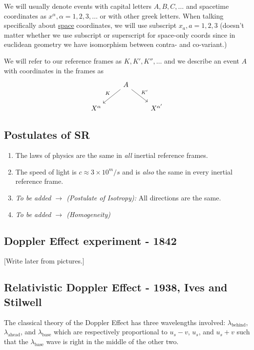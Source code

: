\documentclass{article}
\begin{document}
\vskip 0.5cm
We will usually denote events with capital letters $A, B, C, \dots$ and spacetime coordinates as $x^{\alpha}, \alpha = 1,2,3, \dots$ or with other greek letters. When talking specifically about \underline{space} coordinates, we will use subscript $x_a, a = 1, 2, 3$ (doesn't matter whether we use subscript or superscript for space-only coords since in euclidean geometry we have isomorphism between contra- and co-variant.)

\vskip 0.5cm
We will refer to our reference frames as $K, K', K'', \dots$ and we describe an event $A$ with coordinates in the frames as 
\[\begin{tikzcd}
	& A \\
	{X^{\alpha}} && {X^{\alpha'}}
	\arrow["K"', from=1-2, to=2-1]
	\arrow["{K'}", from=1-2, to=2-3]
\end{tikzcd}\]

\vskip 1cm
\subsection{Postulates of SR}
\begin{enumerate}
  \item The laws of physics are the same in \emph{all} inertial reference frames.
  \item The speed of light is $c \approx 3 \times 10^ m/s$ and is \emph{also} the same in every inertial reference frame.
  \item \emph{To be added $\rightarrow$ (Postulate of Isotropy):} All directions are the same.
  \item \emph{To be added $\rightarrow$ (Homogeneity)} 
\end{enumerate}

\vskip 1cm
\subsection{Doppler Effect experiment - 1842}

[Write later from pictures.]

\vskip 1cm
\subsection{Relativistic Doppler Effect - 1938, Ives and Stilwell}

The classical theory of the Doppler Effect has three wavelengths involved: $\lambda_{\text{behind}}$, $\lambda_{\text{ahead}}$, and $\lambda_{\text{base}}$ which are respectively proportional to $u_s - v$, $u_s$, and  $u_s + v$ such that the $\lambda_{\text{base}}$ wave is right in the middle of the other two.
\end{document}
